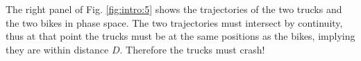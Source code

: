 \begin{ex}
The right panel of Fig. \ref{fig:intro:5} shows the trajectories of the two trucks  and the two bikes in phase space. 
The two trajectories must intersect by continuity, thus at that point the trucks must be at the same positions as the bikes, implying they are within distance $D$. Therefore the trucks must crash!	
\end{ex}


